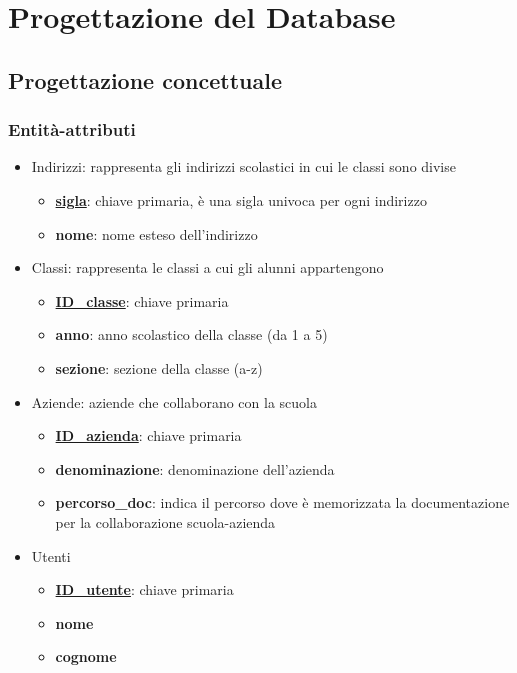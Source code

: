 \documentclass[12pt]{article}
\begin{document}
\section{Progettazione del Database}
\subsection{Progettazione concettuale}
\subsubsection{Entità-attributi}
\begin{itemize}
    \item Indirizzi: rappresenta gli indirizzi scolastici in cui le classi sono divise
    \begin{itemize}
        \item \textbf{\underline{sigla}}: chiave primaria, è una sigla univoca per ogni indirizzo 
        \item \textbf{nome}: nome esteso dell'indirizzo
    \end{itemize}
    \item Classi: rappresenta le classi a cui gli alunni appartengono
    \begin{itemize}
        \item \textbf{\underline{ID\_classe}}: chiave primaria
        \item \textbf{anno}: anno scolastico della classe (da 1 a 5)
        \item \textbf{sezione}: sezione della classe (a-z)
    \end{itemize}
    \item Aziende: aziende che collaborano con la scuola 
    \begin{itemize}
        \item \textbf{\underline{ID\_azienda}}: chiave primaria
        \item \textbf{denominazione}: denominazione dell'azienda
        \item \textbf{percorso\_doc}: indica il percorso dove è memorizzata la documentazione per la collaborazione scuola-azienda
    \end{itemize}
    \item Utenti
    \begin{itemize}
        \item \textbf{\underline{ID\_utente}}: chiave primaria
        \item \textbf{nome}
        \item \textbf{cognome}

\end{itemize}
\end{itemize}
\end{document}

